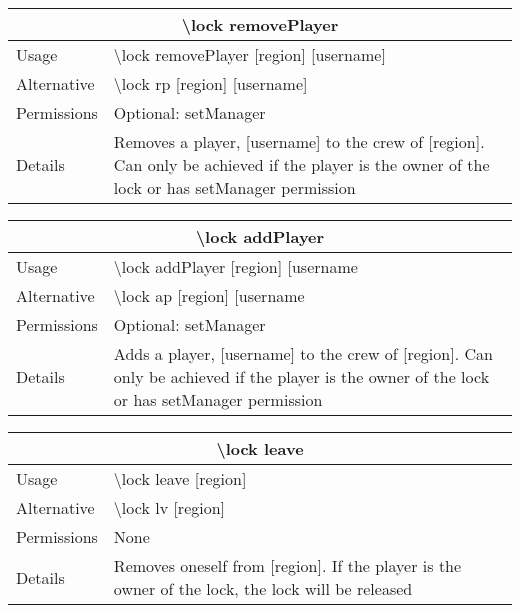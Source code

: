 \documentclass[a4paper,twoside,notitlepage,11pt]{article}
\begin{document}
\begin{center}
\begin{tabular}{|p{2cm}|p{12.5cm}|} \hline
\multicolumn{2}{|c|}{\textbf{\textbackslash lock removePlayer}} \\ \hline
Usage       & \textbackslash lock removePlayer [region] [username] \\ \hline
Alternative & \textbackslash lock rp [region] [username]\\ \hline
Permissions & Optional: setManager \\ \hline
Details 	& Removes a player, [username] to the crew of [region]. Can only be achieved if the player is the owner of the lock or has setManager permission \\ \hline
\end{tabular}
\end{center}

\begin{center}
\begin{tabular}{|p{2cm}|p{12.5cm}|} \hline
\multicolumn{2}{|c|}{\textbf{\textbackslash lock addPlayer}} \\ \hline
Usage       & \textbackslash lock addPlayer [region] [username \\ \hline
Alternative & \textbackslash lock ap [region] [username\\ \hline
Permissions & Optional: setManager \\ \hline
Details 	& Adds a player, [username] to the crew of [region]. Can only be achieved if the player is the owner of the lock or has setManager permission \\ \hline
\end{tabular}
\end{center}

\begin{center}
\begin{tabular}{|p{2cm}|p{12.5cm}|} \hline
\multicolumn{2}{|c|}{\textbf{\textbackslash lock leave}} \\ \hline
Usage       & \textbackslash lock leave [region] \\ \hline
Alternative & \textbackslash lock lv [region] \\ \hline
Permissions & None \\ \hline
Details 	& Removes oneself from [region]. If the player is the owner of the lock, the lock will be released \\ \hline
\end{tabular}
\end{center}
\end{document}
